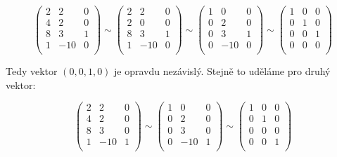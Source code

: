 \documentclass{fkssolpub}
\begin{document}
\[
  \left(
  \begin{array}{cc|c}
    2 & 2 & 0 \\
    4 & 2 & 0 \\
    8 & 3 & 1 \\
    1 & -10 & 0 \\
  \end{array}
  \right) \sim \left(
  \begin{array}{cc|c}
    2 & 2 & 0 \\
    2 & 0 & 0 \\
    8 & 3 & 1 \\
    1 & -10 & 0 \\
  \end{array}
  \right) \sim \left(
  \begin{array}{cc|c}
    1 & 0 & 0 \\
    0 & 2 & 0 \\
    0 & 3 & 1 \\
    0 & -10 & 0 \\
  \end{array}
  \right) \sim \left(
  \begin{array}{cc|c}
    1 & 0 & 0 \\
    0 & 1 & 0 \\
    0 & 0 & 1 \\
    0 & 0 & 0 \\
  \end{array}
  \right)
\]

Tedy vektor $(0,0,1,0)$ je opravdu nezávislý. Stejně to uděláme pro druhý vektor:

\[
  \left(
  \begin{array}{cc|c}
    2 & 2 & 0 \\
    4 & 2 & 0 \\
    8 & 3 & 0 \\
    1 & -10 & 1 \\
  \end{array}
  \right) \sim \left(
  \begin{array}{cc|c}
    1 & 0 & 0 \\
    0 & 2 & 0 \\
    0 & 3 & 0 \\
    0 & -10 & 1 \\
  \end{array}
  \right) \sim \left(
  \begin{array}{cc|c}
    1 & 0 & 0 \\
    0 & 1 & 0 \\
    0 & 0 & 0 \\
    0 & 0 & 1 \\
  \end{array}
  \right) 
\]
\end{document}
